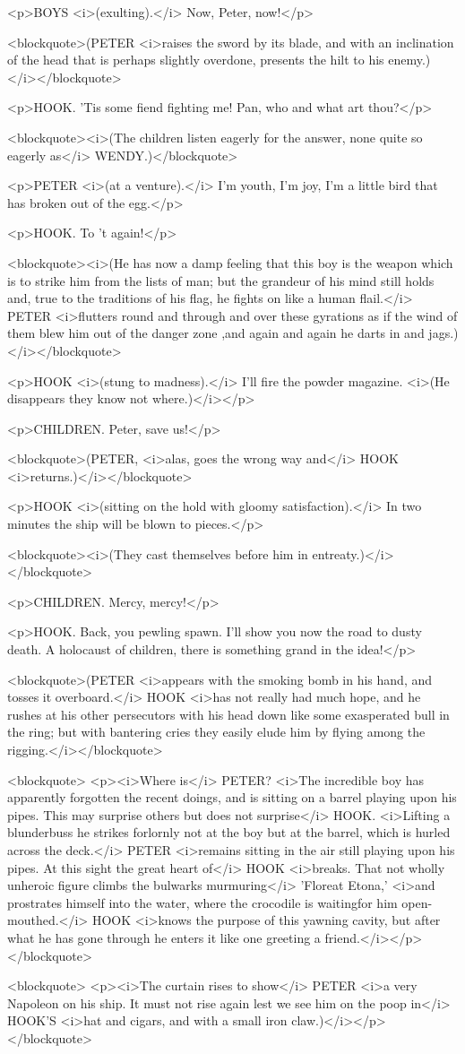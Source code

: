 <p>BOYS <i>(exulting).</i> Now, Peter, now!</p>

<blockquote>(PETER <i>raises the sword by its blade, and with an
inclination of the head that is perhaps slightly overdone, presents
the hilt to his enemy.)</i></blockquote>

<p>HOOK. 'Tis some fiend fighting me! Pan, who and what art thou?</p>

<blockquote><i>(The children listen eagerly for the answer, none
quite so eagerly as</i> WENDY.)</blockquote>

<p>PETER <i>(at a venture).</i> I'm youth, I'm joy, I'm a little bird
that has broken out of the egg.</p>

<p>HOOK. To 't again!</p>

<blockquote><i>(He has now a damp feeling that this boy is the weapon
which is to strike him from the lists of man; but the grandeur of his
mind still holds and, true to the traditions of his flag, he fights
on like a human flail.</i> PETER <i>flutters round and through and
over these gyrations as if the wind of them blew him out of the
danger zone ,and again and again he darts in and
jags.)</i></blockquote>

<p>HOOK <i>(stung to madness).</i> I'll fire the powder magazine.
<i>(He disappears they know not where.)</i></p>

<p>CHILDREN. Peter, save us!</p>

<blockquote>(PETER, <i>alas, goes the wrong way and</i> HOOK
<i>returns.)</i></blockquote>

<p>HOOK <i>(sitting on the hold with gloomy satisfaction).</i> In two
minutes the ship will be blown to pieces.</p>

<blockquote><i>(They cast themselves before him in
entreaty.)</i></blockquote>

<p>CHILDREN. Mercy, mercy!</p>

<p>HOOK. Back, you pewling spawn. I'll show you now the road to dusty
death. A holocaust of children, there is something grand in the
idea!</p>

<blockquote>(PETER <i>appears with the smoking bomb in his hand, and
tosses it overboard.</i> HOOK <i>has not really had much hope, and he
rushes at his other persecutors with his head down like some
exasperated bull in the ring; but with bantering cries they easily
elude him by flying among the rigging.</i></blockquote>

<blockquote>
<p><i>Where is</i> PETER? <i>The incredible boy has apparently
forgotten the recent doings, and is sitting on a barrel playing upon
his pipes. This may surprise others but does not surprise</i> HOOK.
<i>Lifting a blunderbuss he strikes forlornly not at the boy but at
the barrel, which is hurled across the deck.</i> PETER <i>remains
sitting in the air still playing upon his pipes. At this sight the
great heart of</i> HOOK <i>breaks. That not wholly unheroic figure
climbs the bulwarks murmuring</i> 'Floreat Etona,' <i>and prostrates
himself into the water, where the crocodile is waitingfor him
open-mouthed.</i> HOOK <i>knows the purpose of this yawning cavity,
but after what he has gone through he enters it like one greeting a
friend.</i></p>
</blockquote>

<blockquote>
<p><i>The curtain rises to show</i> PETER <i>a very Napoleon on his
ship. It must not rise again lest we see him on the poop in</i>
HOOK'S <i>hat and cigars, and with a small iron claw.)</i></p>
</blockquote>
